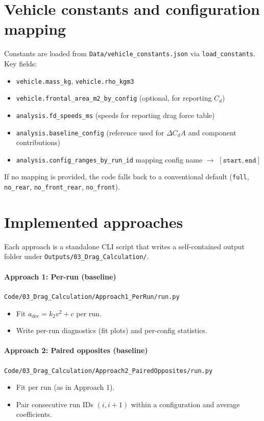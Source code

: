\documentclass[11pt,a4paper]{article}
\begin{document}
\section{Vehicle constants and configuration mapping}
Constants are loaded from \texttt{Data/vehicle\_constants.json} via \texttt{load\_constants}.
Key fields:
\begin{itemize}
  \item \texttt{vehicle.mass\_kg}, \texttt{vehicle.rho\_kgm3}
  \item \texttt{vehicle.frontal\_area\_m2\_by\_config} (optional, for reporting \(C_d\))
  \item \texttt{analysis.fd\_speeds\_ms} (speeds for reporting drag force table)
  \item \texttt{analysis.baseline\_config} (reference used for \(\Delta C_dA\) and component contributions)
  \item \texttt{analysis.config\_ranges\_by\_run\_id} mapping config name $\rightarrow$ \([\texttt{start},\texttt{end}]\)
\end{itemize}

If no mapping is provided, the code falls back to a conventional default
(\texttt{full}, \texttt{no\_rear}, \texttt{no\_front\_rear}, \texttt{no\_front}).

\section{Implemented approaches}
Each approach is a standalone CLI script that writes a self-contained output folder under \texttt{Outputs/03\_Drag\_Calculation/}.

\paragraph{Approach 1: Per-run (baseline)}
  \texttt{Code/03\_Drag\_Calculation/Approach1\_PerRun/run.py}
\begin{itemize}
  \item Fit \(a_\mathrm{dec}=k_2 v^2 + c\) per run.
  \item Write per-run diagnostics (fit plots) and per-config statistics.
\end{itemize}

\paragraph{Approach 2: Paired opposites (baseline)}
  \texttt{Code/03\_Drag\_Calculation/Approach2\_PairedOpposites/run.py}
\begin{itemize}
  \item Fit per run (as in Approach 1).
  \item Pair consecutive run IDs \((i,i{+}1)\) within a configuration and average coefficients.
\end{itemize}
\end{document}
